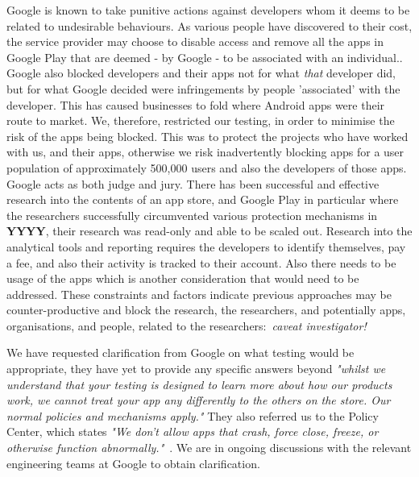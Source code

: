 Google is known to take punitive actions against developers whom it deems to be related to undesirable behaviours. 
As various people have discovered to their cost, the service provider may choose to disable access and remove all the apps in Google Play that are deemed - by Google - to be associated with an individual.\citep{Martinez_2019}. Google also blocked developers and their apps not for what \emph{that} developer did, but for what Google decided were infringements by people 'associated' with the developer. This has caused businesses to fold where Android apps were their route to market\citep{Martinez_2019, mark_dodson_medium_story}. We, therefore, restricted our testing, in order to minimise the risk of the apps being blocked. This was to protect the projects who have worked with us, and their apps, otherwise we risk inadvertently blocking apps for a user population of approximately 500,000 users and also the developers of those apps. Google acts as both judge and jury. There has been successful and effective research into the contents of an app store, and Google Play in particular where the researchers successfully circumvented various protection mechanisms in \textbf{YYYY}, 
their research was read-only and able to be scaled out. Research into the analytical tools and reporting requires the developers to identify themselves, pay a fee, and also their activity is tracked to their account. Also there needs to be usage of the apps which is another consideration that would need to be addressed. These constraints and factors indicate previous approaches may be counter-productive and block the research, the researchers, and potentially apps, organisations, and people, related to the researchers:~\emph{caveat investigator!}



We have requested clarification from Google on what testing would be appropriate, they have yet to provide any specific answers beyond \emph{"whilst we understand that your testing is designed to learn more about how our products work, we cannot treat your app any differently to the others on the store. Our normal policies and mechanisms apply."} They also referred us to the Policy Center, which states \emph{"We don’t allow apps that crash, force close, freeze, or otherwise function abnormally."}~\citep{google_play_policy_center_broken_functionality}. We are in ongoing discussions with the relevant engineering teams at Google to obtain clarification.

